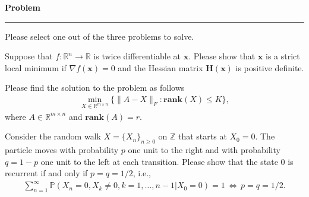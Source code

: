\documentclass[11pt,letter,notitlepage]{article}
\newcommand{\posted}{\text{Sep. 10, 2018}}       			%
\newcommand{\due}{\text{Sep. 17, 2018}} 			%
\newcommand{\hwno}{\text{3}} 		           			%
\newcommand{\rank}[1]{ \textbf{rank}  (#1)  }
\newcommand{\id}{\text{}}		       			%
\begin{document}
\vspace*{-4\baselineskip}
\thispagestyle{empty}


\begin{center}
  {\bf\large Problem}\\
\end{center}


\noindent
\rule{\textwidth}{2pt}

\medskip

Please select one out of the three problems to solve.

\begin{problem}
  Suppose that $f:\mathbb{R}^n\rightarrow\mathbb{R}$ is twice differentiable at $\bm{x}$. Please show that $\bm{x}$ is a strict local minimum if $\nabla f(\bm{x})=0$ and the Hessian matrix $\bm{H}(\bm{x})$ is positive definite.
\end{problem}

\begin{problem}
  Please find the solution to the problem as follows
  \begin{align*}
    \min_{X\in\mathbb{R}^{m\times n}}\{\|A-X\|_F:\rank{X}\leq K\},
  \end{align*}
  where $A\in \mathbb{R}^{m\times n}$ and $\rank{A}=r$.
\end{problem}

\begin{problem}
  Consider the random walk $ X=\{X_n\}_{n\geq 0} $ on $ \mathbb{Z} $ that starts at $ X_0=0 $. The particle moves with probability $ p $ one unit to the right and with probability $ q=1-p $ one unit to the left at each transition. Please show that the state $ 0 $ is recurrent if and only if $ p=q=1/2 $, i.e.,
  \begin{align*}
    \sum_{n=1}^{\infty} \mathbb{P}(X_n=0, X_k \neq 0, k = 1,\dots,n-1|X_0=0)=1\, \Leftrightarrow\, p=q=1/2.
  \end{align*}
\end{problem}
\end{document}
